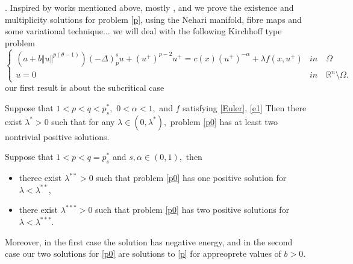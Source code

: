\documentclass[10pt,twoside,reqno,centertags,draft]{amsart}
\begin{document}
\cite{assunccao2017existence}.\newline
Inspired by works mentioned above, mostly \cite{fiscella2019nehari}, \cite{ghanmi2016multiplicity} and \cite{saoudi2017multiplicity} we prove the existence and multiplicity solutions for problem \ref{p}, using the Nehari manifold, fibre maps and some variational technique...\newline
we will deal with the following Kirchhoff type problem
\begin{equation}\label{p}
\begin{cases}
\left( a +b\Vert u\Vert^{p(\theta -1)}\right)\left(-\Delta\right)_{p}^{s}u +(u^+)^{p-2}u^+ = c(x)(u^+)^{-\alpha} + \lambda f(x,u^+) & \textit{in} \quad \Omega\\
u = 0 &  \textit{in} \quad \mathbb{R}^n\setminus \Omega.
\end{cases}
\end{equation}
our first result is about the subcritical case
\begin{theorem}\label{th1}
Suppose that $ 1 < p < q < p_s^*,$ $ 0 <\alpha<1,$  and $ f$ satisfying \ref{Euler}, \ref{e1} Then there exist $ \lambda^* > 0$ such that for any $ \lambda \in (0, \lambda^*),$ problem \ref{p0} has at least two nontrivial positive solutions.
\end{theorem}
\begin{theorem}\label{th2}
Suppose that $ 1 < p < q = p_s^*$ and $ s, \alpha \in (0 ,1),$ then 
\begin{itemize}
\item theree exist $ \lambda^{**} >0$ such that problem \ref{p0} has one positive solution for $ \lambda < \lambda^{**},$
\item there exist $ \lambda^{***} >0$ such that problem \ref{p0} has two positive solutions for $ \lambda < \lambda^{***}.$
\end{itemize}
Moreover, in the first case the solution has negative energy, and in the second case our two solutions for \ref{p0} are solutions to \ref{p} for 
appreoprete values of $ b >0.$
\end{theorem}
\end{document}
